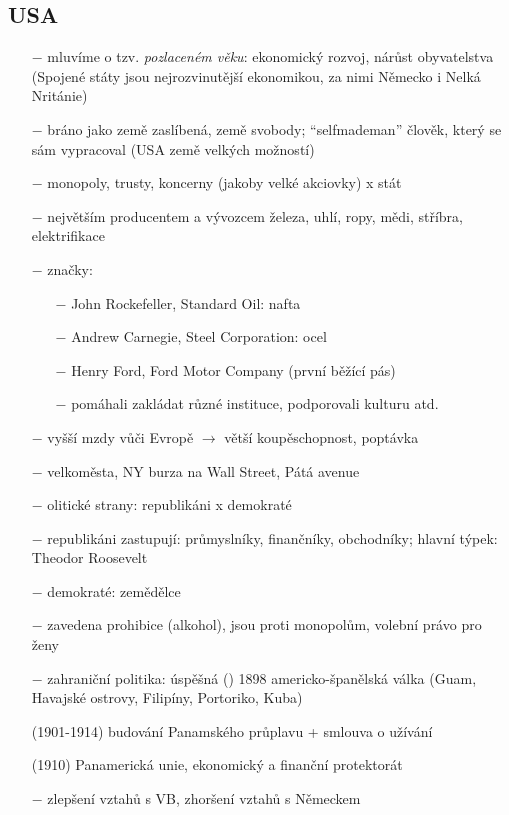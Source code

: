 \documentclass{article}
\begin{document}
\subsection*{USA}
\begin{itemize}
    \vspace{-0.5em}
    \setlength\itemsep{0.15em}
    \item[$-$] mluvíme o tzv. \textit{pozlaceném věku}: ekonomický rozvoj, nárůst obyvatelstva (Spojené státy jsou nejrozvinutější ekonomikou, za nimi Německo i Nelká Nritánie)
    \item[$-$] bráno jako země zaslíbená, země svobody; “selfmademan” člověk, který se sám vypracoval (USA země velkých možností)
    \item[$-$] monopoly, trusty, koncerny (jakoby velké akciovky) x stát
    \item[$-$] největším producentem a vývozcem železa, uhlí, ropy, mědi, stříbra, elektrifikace
    \item[$-$] značky:  \begin{itemize}
        \vspace{-0.5em}
        \setlength\itemsep{0.15em}
        \item[$-$] John Rockefeller, Standard Oil: nafta
        \item[$-$] Andrew Carnegie, Steel Corporation: ocel
        \item[$-$] Henry Ford, Ford Motor Company (první běžící pás)
        \item[$-$] pomáhali zakládat různé instituce, podporovali kulturu atd.
    \end{itemize}
    \item[$-$] vyšší mzdy vůči Evropě $\rightarrow$ větší koupěschopnost, poptávka
    \item[$-$] velkoměsta, NY burza na Wall Street, Pátá avenue
    \item[$-$] olitické strany: republikáni x demokraté
    \item[$-$] republikáni zastupují: průmyslníky, finančníky, obchodníky; hlavní týpek: Theodor Roosevelt
    \item[$-$] demokraté: zemědělce
    \item[$-$] zavedena prohibice (alkohol), jsou proti monopolům, volební právo pro ženy
    \item[$-$] zahraniční politika: úspěšná () 1898 americko-španělská válka (Guam, Havajské ostrovy, Filipíny, Portoriko, Kuba)
    \item[(1901-1914)] budování Panamského průplavu  + smlouva o užívání
    \item[(1910)] Panamerická unie, ekonomický a finanční protektorát
    \item[$-$] zlepšení vztahů s VB, zhoršení vztahů s Německem

\end{itemize}
\end{document}
